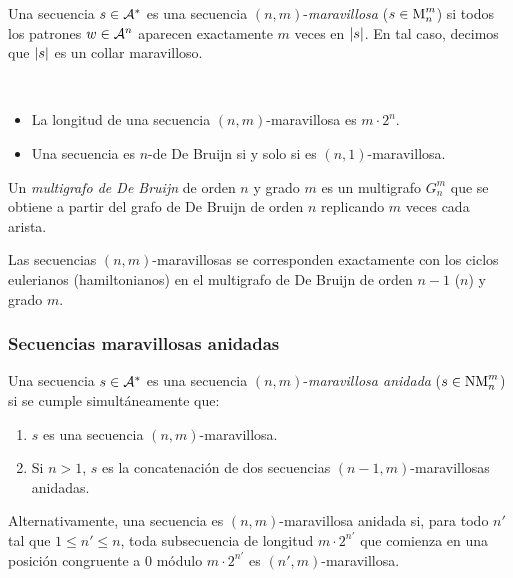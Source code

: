\documentclass[11pt]{article}
\begin{document}
\begin{defi}
	Una secuencia $s \in \mathcal{A}^*$ es una secuencia $(n,m)$-\emph{maravillosa}
	($s \in \text{M}_{n}^{m}$) si todos los patrones $w \in \mathcal{A}^n$ aparecen
	exactamente $m$ veces en $\left\vert s\right\vert$. En tal caso, decimos que $\left\vert s\right\vert$ es
	un collar maravilloso.
\end{defi}

\begin{obs}\ %
	\begin{itemize}
		\item La longitud de una secuencia $(n,m)$-maravillosa es $m \cdot 2^n$.
		\item Una secuencia es $n$-de De Bruijn si y solo si es
		      $(n,1)$-maravillosa.
	\end{itemize}
\end{obs}

\begin{defi}
	Un \emph{multigrafo de De Bruijn} de orden $n$ y grado $m$ es un multigrafo
	$G_n^m$ que se obtiene a partir del grafo de De Bruijn de orden $n$
	replicando $m$ veces cada arista.
\end{defi}

\begin{obs}
	Las secuencias $(n,m)$-maravillosas se corresponden exactamente con los
	ciclos eulerianos (hamiltonianos) en el multigrafo de De Bruijn de orden $n -
		1$ ($n$) y grado $m$.
\end{obs}

\subsubsection{Secuencias maravillosas anidadas}

\begin{defi}
	Una secuencia $s \in \mathcal{A}^*$ es una secuencia $(n,m)$-\emph{maravillosa
		anidada} ($s \in \text{NM}_{n}^{m}$) si se cumple simultáneamente que:
	\begin{enumerate}
		\item $s$ es una secuencia $(n,m)$-maravillosa.
		\item Si $n > 1$, $s$ es la concatenación de dos secuencias
		      $(n-1,m)$-maravillosas anidadas.
	\end{enumerate}

	Alternativamente, una secuencia es $(n,m)$-maravillosa anidada si, para todo
	$n'$ tal que $1 \leq n' \leq n$, toda subsecuencia de longitud
	$m \cdot 2^{n'}$ que comienza en una posición congruente a $0$ módulo
	$m \cdot 2^{n'}$ es $(n',m)$-maravillosa.
\end{defi}
\end{document}
